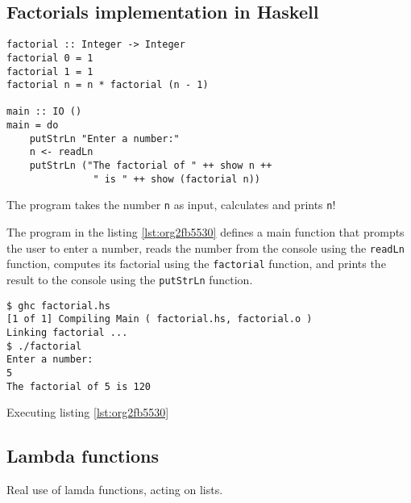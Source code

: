 \documentclass[a4paper, titlepage, twoside]{article}
\begin{document}
\subsection{Factorials implementation in Haskell}
\label{sec:org1c9eedb}

\begin{listing}[htbp]
\begin{verbatim}
factorial :: Integer -> Integer
factorial 0 = 1
factorial 1 = 1
factorial n = n * factorial (n - 1)

main :: IO ()
main = do
    putStrLn "Enter a number:"
    n <- readLn
    putStrLn ("The factorial of " ++ show n ++
               " is " ++ show (factorial n))
\end{verbatim}
\caption{\label{lst:org2fb5530}The program takes the number \texttt{n} as input, calculates and prints \texttt{n}!}
\end{listing}

The program in the listing \ref{lst:org2fb5530} defines a main function that prompts the user to enter a number, reads the number from the console using the \texttt{readLn} function, computes its factorial using the \texttt{factorial} function, and prints the result to the console using the \texttt{putStrLn} function.

\begin{listing}[htbp]
\begin{verbatim}
$ ghc factorial.hs
[1 of 1] Compiling Main ( factorial.hs, factorial.o )
Linking factorial ...
$ ./factorial
Enter a number:
5
The factorial of 5 is 120
\end{verbatim}
\caption{Executing listing \ref{lst:org2fb5530}}
\end{listing}

\subsection{Lambda functions}
\label{sec:orgc4216d9}

Real use of lamda functions, acting on lists.
\end{document}
